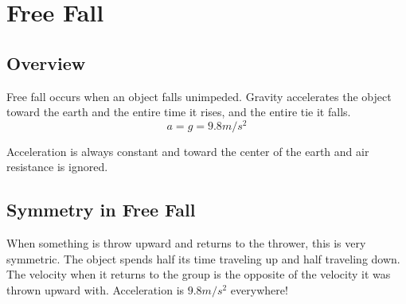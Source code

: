 \section{Free Fall}
	
\subsection{Overview}
Free fall occurs when an object falls unimpeded. Gravity accelerates the object toward the earth and the entire time it rises, and the entire tie it falls. \[a=g=9.8m/s^2\] 
	
Acceleration is always constant and toward the center of the earth and air resistance is ignored. 
	
\subsection{Symmetry in Free Fall}
When something is throw upward and returns to the thrower, this is very symmetric. The object spends half its time traveling up and half traveling down. The velocity when it returns to the group is the opposite of the velocity it was thrown upward with. Acceleration is $9.8 m/s^2$ everywhere!